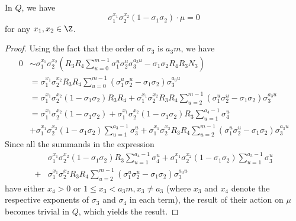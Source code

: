 \paragraph*{}
\begin{lemma}\label{diag}
In $Q$, we have $$\sigma_1^{x_1}\sigma_2^{x_2}(1-\sigma_1\sigma_2)\cdot \mu=0$$
for any $x_1,x_2\in\Z$.
\end{lemma}
\begin{proof}
Using the fact that the order of $\sigma_3$ is $a_3m$, we have
\begin{align*}
0&\sim \sigma_1^{x_1}\sigma_2^{x_2}\left(R_3R_4\sum_{u=0}^{m-1}\sigma_1^{u}\sigma_2^{u}\sigma_3^{a_3u}-\sigma_1\sigma_2R_4R_3N_3\right)\\
&=\sigma_1^{x_1}\sigma_2^{x_2}R_3R_4\sum_{u=0}^{m-1}\left(\sigma_1^{u}\sigma_2^{u}-\sigma_1\sigma_2\right)\sigma_3^{a_3u}\\
&=\sigma_1^{x_1}\sigma_2^{x_2}(1-\sigma_1\sigma_2)R_3R_4+\sigma_1^{x_1}\sigma_2^{x_2}R_3R_4\sum_{u=2}^{m-1}\left(\sigma_1^{u}\sigma_2^{u}-\sigma_1\sigma_2\right)\sigma_3^{a_3u}\\
&=\sigma_1^{x_1}\sigma_2^{x_2}(1-\sigma_1\sigma_2)+
\sigma_1^{x_1}\sigma_2^{x_2}(1-\sigma_1\sigma_2)R_3\sum_{u=1}^{a_4-1}\sigma_4^u
\\
&+
\sigma_1^{x_1}\sigma_2^{x_2}(1-\sigma_1\sigma_2)\sum_{u=1}^{a_3-1}\sigma_3^u+\sigma_1^{x_1}\sigma_2^{x_2}R_3R_4\sum_{u=2}^{m-1}\left(\sigma_1^{u}\sigma_2^{u}-\sigma_1\sigma_2\right)\sigma_3^{a_3u}
\end{align*}
Since all the summands in the expression 
\begin{align*}
&\sigma_1^{x_1}\sigma_2^{x_2}(1-\sigma_1\sigma_2)R_3\sum_{u=1}^{a_4-1}\sigma_4^u
+\sigma_1^{x_1}\sigma_2^{x_2}(1-\sigma_1\sigma_2)\sum_{u=1}^{a_3-1}\sigma_3^u\\
+&\sigma_1^{x_1}\sigma_2^{x_2}R_3R_4\sum_{u=2}^{m-1}\left(\sigma_1^{u}\sigma_2^{u}-\sigma_1\sigma_2\right)\sigma_3^{a_3u}
\end{align*}
have either $x_4>0$ or $ 1\leq x_3<a_3m,  x_3\neq a_3$ (where $x_3$ and $x_4$ denote the respective exponents of $\sigma_3$ and $\sigma_4$ in each term), the result of their action on $\mu$ becomes trivial in $Q$, which yields the result.
\end{proof}

